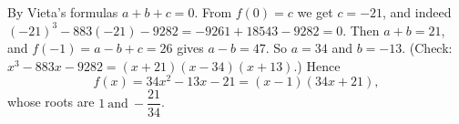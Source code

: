 By Vieta's formulas $a+b+c=0$. From $f(0)=c$ we get $c=-21$, and indeed $(-21)^3-883(-21)-9282=-9261+18543-9282=0$. Then $a+b=21$, and $f(-1)=a-b+c=26$ gives $a-b=47$. So $a=34$ and $b=-13$. (Check: $x^3-883x-9282=(x+21)(x-34)(x+13)$.) Hence
\[f(x)=34x^2-13x-21=(x-1)(34x+21),\]
whose roots are $\boxed{1\ \text{and}\ -\dfrac{21}{34}}$.
